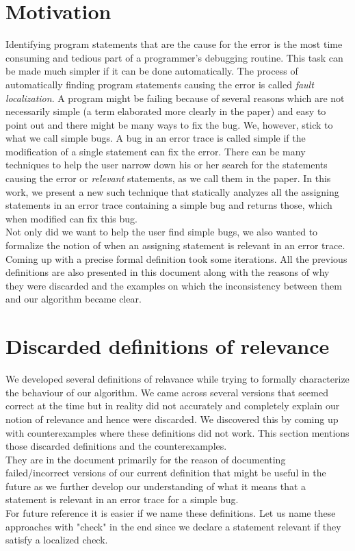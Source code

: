 \documentclass{article}
\begin{document}
\section{Motivation}
Identifying program statements that are the cause for the error is the most time consuming and tedious part of a programmer's debugging routine. This task can be made much simpler if it can be done automatically. The process of automatically finding program statements causing the error is called \textit{fault localization}. A program might be failing because of several reasons which are not necessarily simple (a term elaborated more clearly in the paper) and easy to point out and there might be many ways to fix the bug. We, however, stick to what we call simple bugs. A bug in an error trace is called simple if the modification of a single statement can fix the error. There can be many techniques to help the user narrow down his or her search for the statements  causing the error or \textit{relevant} statements, as we call them in the paper. In this work, we present a new such technique that statically analyzes all the assigning statements in an error trace containing a simple bug and returns those, which when modified can fix this bug.\\
Not only did we want to help the user find simple bugs, we also wanted to formalize the notion of when an assigning statement is relevant in an error trace.
Coming up with a precise formal definition took some iterations. All the previous definitions are also presented in this document along with the reasons of why they were discarded and the examples on which the inconsistency between them and our algorithm became clear.\\
\section{Discarded definitions of relevance}
We developed several definitions of relavance while trying to formally characterize the behaviour of our algorithm. We came across several versions that seemed correct at the time but in reality did not accurately and completely explain our notion of relevance and hence were discarded. We discovered this by coming up with counterexamples where these definitions did not work. This section mentions those discarded definitions and the counterexamples.\\ 
They are in the document primarily for the reason of documenting failed/incorrect versions of our current definition that might be useful in the future as we further develop our understanding of what it means that a statement is relevant in an error trace for a simple bug. \\
For future reference it is easier if we name these definitions. Let us name these approaches with "check" in the end since we declare a statement relevant if they satisfy a localized check. 
\end{document}
